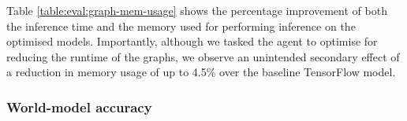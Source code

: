 \begin{table}[htbp]
  \centering
  \caption[Memory usage of optimised graphs]{Relative performance improvement of the graphs optimised by the model-based agent. We show the inference time, and memory used for performing inference on the model.}
  \label{table:eval:graph-mem-usage}
\end{table}

Table \ref{table:eval:graph-mem-usage} shows the percentage improvement of both the inference time and the memory used for performing inference on the optimised models. Importantly, although we tasked the agent to optimise for reducing the runtime of the graphs, we observe an unintended secondary effect of a reduction in memory usage of up to 4.5\% over the baseline TensorFlow model.

\subsubsection{World-model accuracy}
\label{sec:eval:subsubsec:wm-acc}

